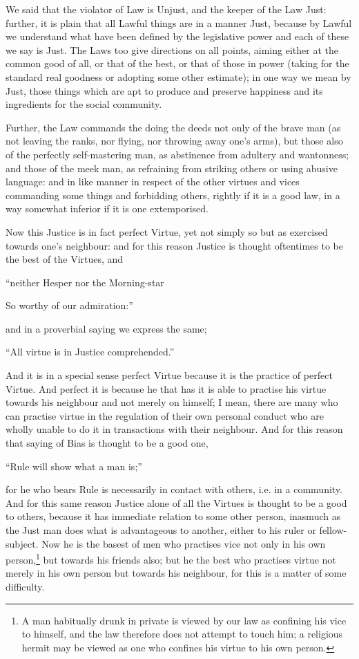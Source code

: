 
We said that the violator of Law is Unjust, and the keeper of the Law Just:
further, it is plain that all Lawful things are in a manner Just, because by
Lawful we understand what have been defined by the legislative power and each
of these we say is Just. The Laws too give directions on all points, aiming
either at the common good of all, or that of the best, or that of those in
power (taking for the standard real goodness or adopting some other estimate);
in one way we mean by Just, those things which are apt to produce and preserve
happiness and its ingredients for the social community.

Further, the Law commands the doing the deeds not only of the brave man (as not
leaving the ranks, nor flying, nor throwing away one’s arms), but those
also of the perfectly self-mastering man, as abstinence from adultery and
wantonness; and those of the meek man, as refraining from striking others or
using abusive language: and in like manner in respect of the other virtues and
vices commanding some things and forbidding others, rightly if it is a good
law, in a way somewhat inferior if it is one extemporised.

Now this Justice is in fact perfect Virtue, yet not simply so but as exercised
towards one’s neighbour: and for this reason Justice is thought
oftentimes to be the best of the Virtues, and

“neither Hesper nor the Morning-star

So worthy of our admiration:”

and in a proverbial saying we express the same;

“All virtue is in Justice comprehended.”

And it is in a special sense perfect Virtue because it is the practice of
perfect Virtue. And perfect it is because he that has it is able to practise
his virtue towards his neighbour and not merely on himself; I mean, there are
many who can practise virtue in the regulation of their own personal conduct
who are wholly unable to do it in transactions with their neighbour. And for
this reason that saying of Bias is thought to be a good one,

“Rule will show what a man is;”

for he who bears Rule is necessarily in contact with others, i.e. in a
community. And for this same reason Justice alone of all the Virtues is thought
to be a good to others, because it has immediate relation to some other person,
inasmuch as the Just man does what is advantageous to another, either to his
ruler or fellow-subject. Now he is the basest of men who practises vice not
only in his own person,\footnote{A man habitually drunk in private is viewed by our law as confining his vice to
himself, and the law therefore does not attempt to touch him; a religious
hermit may be viewed as one who confines his virtue to his own person.}
but towards his friends also; but he the best who practises virtue not merely
in his own person but towards his neighbour, for this is a matter of some
difficulty.

